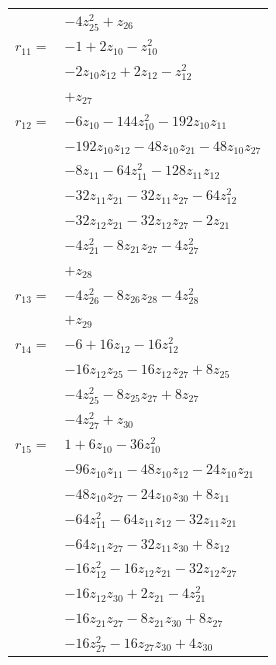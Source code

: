\begin{longtable}{@{}r@{\;}l@{}}
 & \(\displaystyle -4z_{25}^{2} +z_{26}\) \\[3pt]
\(r_{11}=\) & \(\displaystyle -1 +2z_{10} -z_{10}^{2}\) \\
 & \(\displaystyle -2z_{10}z_{12} +2z_{12} -z_{12}^{2}\) \\
 & \(\displaystyle +z_{27}\) \\[3pt]
\(r_{12}=\) & \(\displaystyle -6z_{10} -144z_{10}^{2} -192z_{10}z_{11}\) \\
 & \(\displaystyle -192z_{10}z_{12} -48z_{10}z_{21} -48z_{10}z_{27}\) \\
 & \(\displaystyle -8z_{11} -64z_{11}^{2} -128z_{11}z_{12}\) \\
 & \(\displaystyle -32z_{11}z_{21} -32z_{11}z_{27} -64z_{12}^{2}\) \\
 & \(\displaystyle -32z_{12}z_{21} -32z_{12}z_{27} -2z_{21}\) \\
 & \(\displaystyle -4z_{21}^{2} -8z_{21}z_{27} -4z_{27}^{2}\) \\
 & \(\displaystyle +z_{28}\) \\[3pt]
\(r_{13}=\) & \(\displaystyle -4z_{26}^{2} -8z_{26}z_{28} -4z_{28}^{2}\) \\
 & \(\displaystyle +z_{29}\) \\[3pt]
\(r_{14}=\) & \(\displaystyle -6 +16z_{12} -16z_{12}^{2}\) \\
 & \(\displaystyle -16z_{12}z_{25} -16z_{12}z_{27} +8z_{25}\) \\
 & \(\displaystyle -4z_{25}^{2} -8z_{25}z_{27} +8z_{27}\) \\
 & \(\displaystyle -4z_{27}^{2} +z_{30}\) \\[3pt]
\(r_{15}=\) & \(\displaystyle 1 +6z_{10} -36z_{10}^{2}\) \\
 & \(\displaystyle -96z_{10}z_{11} -48z_{10}z_{12} -24z_{10}z_{21}\) \\
 & \(\displaystyle -48z_{10}z_{27} -24z_{10}z_{30} +8z_{11}\) \\
 & \(\displaystyle -64z_{11}^{2} -64z_{11}z_{12} -32z_{11}z_{21}\) \\
 & \(\displaystyle -64z_{11}z_{27} -32z_{11}z_{30} +8z_{12}\) \\
 & \(\displaystyle -16z_{12}^{2} -16z_{12}z_{21} -32z_{12}z_{27}\) \\
 & \(\displaystyle -16z_{12}z_{30} +2z_{21} -4z_{21}^{2}\) \\
 & \(\displaystyle -16z_{21}z_{27} -8z_{21}z_{30} +8z_{27}\) \\
 & \(\displaystyle -16z_{27}^{2} -16z_{27}z_{30} +4z_{30}\) \\

\end{longtable}
